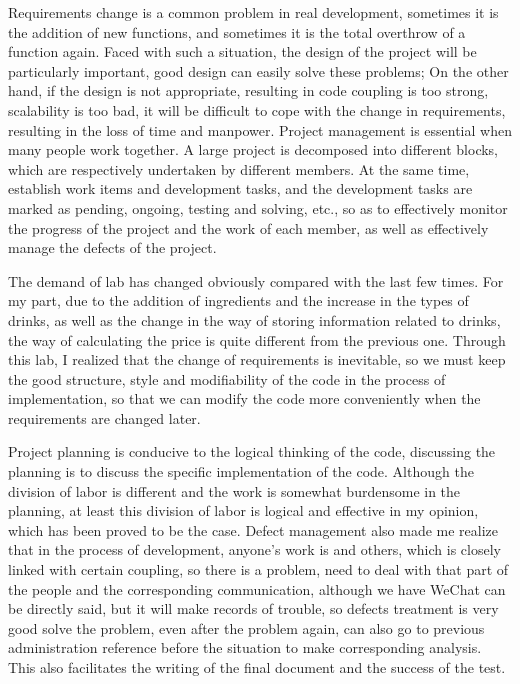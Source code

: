 \documentclass[a4paper]{report}
\begin{document}
Requirements change is a common problem in real development, sometimes it is the addition of new functions, and sometimes it is the total overthrow of a function again. Faced with such a situation, the design of the project will be particularly important, good design can easily solve these problems; On the other hand, if the design is not appropriate, resulting in code coupling is too strong, scalability is too bad, it will be difficult to cope with the change in requirements, resulting in the loss of time and manpower. Project management is essential when many people work together. A large project is decomposed into different blocks, which are respectively undertaken by different members. At the same time, establish work items and development tasks, and the development tasks are marked as pending, ongoing, testing and solving, etc., so as to effectively monitor the progress of the project and the work of each member, as well as effectively manage the defects of the project.





The demand of lab has changed obviously compared with the last few times. For my part, due to the addition of ingredients and the increase in the types of drinks, as well as the change in the way of storing information related to drinks, the way of calculating the price is quite different from the previous one. Through this lab, I realized that the change of requirements is inevitable, so we must keep the good structure, style and modifiability of the code in the process of implementation, so that we can modify the code more conveniently when the requirements are changed later.



Project planning is conducive to the logical thinking of the code, discussing the planning is to discuss the specific implementation of the code. Although the division of labor is different and the work is somewhat burdensome in the planning, at least this division of labor is logical and effective in my opinion, which has been proved to be the case. Defect management also made me realize that in the process of development, anyone's work is and others, which is closely linked with certain coupling, so there is a problem, need to deal with that part of the people and the corresponding communication, although we have WeChat can be directly said, but it will make records of trouble, so defects treatment is very good solve the problem, even after the problem again, can also go to previous administration reference before the situation to make corresponding analysis. This also facilitates the writing of the final document and the success of the test.
\end{document}
